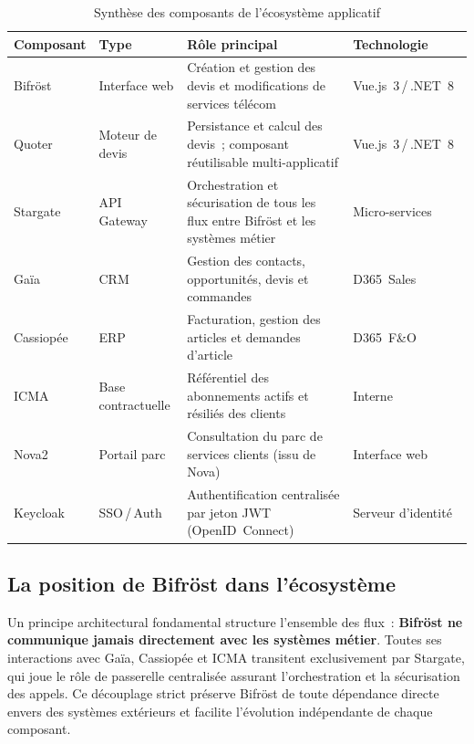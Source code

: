 \begin{table}[H]
\caption{Synth\`ese des composants de l'\'ecosyst\`eme applicatif}
\label{tab:composants_ecosysteme}
\centering
\renewcommand{\arraystretch}{1.55}
\begin{tabular}{|>{\raggedright\arraybackslash}p{2.3cm}|>{\raggedright\arraybackslash}p{2.1cm}|>{\raggedright\arraybackslash}p{5.5cm}|>{\raggedright\arraybackslash}p{3.0cm}|}
\hline
\rowcolor{gray!15}
\textbf{Composant} & \textbf{Type} & \textbf{R\^ole principal} & \textbf{Technologie} \\
\hline
Bifr\"ost & Interface web & Cr\'eation et gestion des devis et modifications de services t\'el\'ecom & Vue.js~3\,/\,.NET~8 \\
\hline
Quoter & Moteur de devis & Persistance et calcul des devis~; composant r\'eutilisable multi-applicatif & Vue.js~3\,/\,.NET~8\ \\
\hline
Stargate & API Gateway & Orchestration et s\'ecurisation de tous les flux entre Bifr\"ost et les syst\`emes m\'etier & Micro-services \\
\hline
Ga\"ia & CRM & Gestion des contacts, opportunit\'es, devis et commandes & D365~Sales \\
\hline
Cassiop\'ee & ERP & Facturation, gestion des articles et demandes d'article & D365~F\&O \\
\hline
ICMA & Base contractuelle & R\'ef\'erentiel des abonnements actifs et r\'esili\'es des clients & Interne\, \\
\hline
Nova2 & Portail parc & Consultation du parc de services clients (issu de Nova) & Interface web \\
\hline
Keycloak & SSO\,/\,Auth & Authentification centralis\'ee par jeton JWT (OpenID~Connect) & Serveur d'identit\'e \\
\hline
\end{tabular}
\end{table}

\subsection{La position de Bifr\"ost dans l'\'ecosyst\`eme}

Un principe architectural fondamental structure l'ensemble des flux~: \textbf{Bifr\"ost ne communique jamais directement avec les syst\`emes m\'etier}. Toutes ses interactions avec Ga\"ia, Cassiop\'ee et ICMA transitent exclusivement par Stargate, qui joue le r\^ole de passerelle centralis\'ee assurant l'orchestration et la s\'ecurisation des appels. Ce d\'ecouplage strict pr\'eserve Bifr\"ost de toute d\'ependance directe envers des syst\`emes ext\'erieurs et facilite l'\'evolution ind\'ependante de chaque composant.

